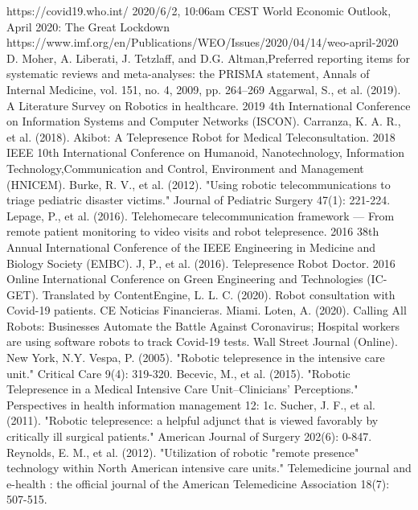 \documentclass[a4paper]{article}
\begin{document}
\begin{thebibliography}{99} 
    https://covid19.who.int/ 2020/6/2, 10:06am CEST
    World Economic Outlook, April 2020: The Great Lockdown https://www.imf.org/en/Publications/WEO/Issues/2020/04/14/weo-april-2020
    D. Moher, A. Liberati, J. Tetzlaff, and D.G. Altman,Preferred reporting items for systematic reviews and meta-analyses: the PRISMA statement, Annals of Internal Medicine, vol. 151, no. 4, 2009, pp. 264–269
    Aggarwal, S., et al. (2019). A Literature Survey on Robotics in healthcare. 2019 4th International Conference on Information Systems and Computer Networks (ISCON).
    Carranza, K. A. R., et al. (2018). Akibot: A Telepresence Robot for Medical Teleconsultation. 2018 IEEE 10th International Conference on Humanoid, Nanotechnology, Information Technology,Communication and Control, Environment and Management (HNICEM).
    Burke, R. V., et al. (2012). "Using robotic telecommunications to triage pediatric disaster victims." Journal of Pediatric Surgery 47(1): 221-224.
    Lepage, P., et al. (2016). Telehomecare telecommunication framework — From remote patient monitoring to video visits and robot telepresence. 2016 38th Annual International Conference of the IEEE Engineering in Medicine and Biology Society (EMBC).
    J, P., et al. (2016). Telepresence Robot Doctor. 2016 Online International Conference on Green Engineering and Technologies (IC-GET).
    Translated by ContentEngine, L. L. C. (2020). Robot consultation with Covid-19 patients. CE Noticias Financieras. Miami.
    Loten, A. (2020). Calling All Robots: Businesses Automate the Battle Against Coronavirus; Hospital workers are using software robots to track Covid-19 tests. Wall Street Journal (Online). New York, N.Y.
    Vespa, P. (2005). "Robotic telepresence in the intensive care unit." Critical Care 9(4): 319-320.
    Becevic, M., et al. (2015). "Robotic Telepresence in a Medical Intensive Care Unit--Clinicians' Perceptions." Perspectives in health information management 12: 1c.
    Sucher, J. F., et al. (2011). "Robotic telepresence: a helpful adjunct that is viewed favorably by critically ill surgical patients." American Journal of Surgery 202(6): 0-847.
    Reynolds, E. M., et al. (2012). "Utilization of robotic "remote presence" technology within North American intensive care units." Telemedicine journal and e-health : the official journal of the American Telemedicine Association 18(7): 507-515.

\end{thebibliography}
\end{document}
